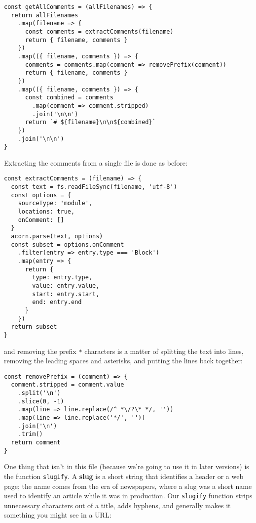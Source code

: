 \documentclass[krantzl]{krantz}
\newcommand{\glossref}[1]{\textbf{#1}}
\begin{document}
\begin{lstlisting}[frame=single,frameround=tttt]
const getAllComments = (allFilenames) => {
  return allFilenames
    .map(filename => {
      const comments = extractComments(filename)
      return { filename, comments }
    })
    .map(({ filename, comments }) => {
      comments = comments.map(comment => removePrefix(comment))
      return { filename, comments }
    })
    .map(({ filename, comments }) => {
      const combined = comments
        .map(comment => comment.stripped)
        .join('\n\n')
      return `# ${filename}\n\n${combined}`
    })
    .join('\n\n')
}
\end{lstlisting}



Extracting the comments from a single file is done as before:


\begin{lstlisting}[frame=single,frameround=tttt]
const extractComments = (filename) => {
  const text = fs.readFileSync(filename, 'utf-8')
  const options = {
    sourceType: 'module',
    locations: true,
    onComment: []
  }
  acorn.parse(text, options)
  const subset = options.onComment
    .filter(entry => entry.type === 'Block')
    .map(entry => {
      return {
        type: entry.type,
        value: entry.value,
        start: entry.start,
        end: entry.end
      }
    })
  return subset
}
\end{lstlisting}



\noindent and removing the prefix \texttt{*} characters is a matter of splitting the text into lines,
removing the leading spaces and asterisks,
and putting the lines back together:


\begin{lstlisting}[frame=single,frameround=tttt]
const removePrefix = (comment) => {
  comment.stripped = comment.value
    .split('\n')
    .slice(0, -1)
    .map(line => line.replace(/^ *\/?\* */, ''))
    .map(line => line.replace('*/', ''))
    .join('\n')
    .trim()
  return comment
}
\end{lstlisting}



One thing that isn't in this file (because we're going to use it in later versions)
is the function \texttt{slugify}.
A \glossref{slug} is a short string that identifies a header or a web page;
the name comes from the era of newspapers,
where a slug was a short name used to identify an article while it was in production.
Our \texttt{slugify} function strips unnecessary characters out of a title,
adds hyphens,
and generally makes it something you might see in a URL:
\end{document}
